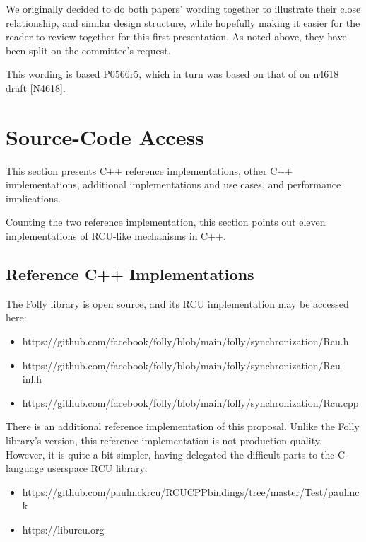 We originally decided to do both papers' wording together to illustrate
their close relationship, and similar design structure, while hopefully
making it easier for the reader to review together for this first
presentation.
As noted above, they have been split on the committee's request.

This wording is based P0566r5, which in turn was based on that of on
n4618 draft [N4618].

\section{Source-Code Access}
\label{sec:Source-Code Access}

This section presents C++ reference implementations, other
C++ implementations, additional implementations and use cases,
and performance implications.

Counting the two reference implementation, this section points out
eleven implementations of RCU-like mechanisms in C++.

\subsection{Reference C++ Implementations}
\label{sec:Reference C++ Implementations}

The Folly library is open source, and its RCU implementation may be
accessed here:

\begin{itemize}
\item	https://github.com/facebook/folly/blob/main/folly/synchronization/Rcu.h
\item	https://github.com/facebook/folly/blob/main/folly/synchronization/Rcu-inl.h
\item	https://github.com/facebook/folly/blob/main/folly/synchronization/Rcu.cpp
\end{itemize}

There is an additional reference implementation of this proposal.
Unlike the Folly library's version, this reference implementation is
not production quality.
However, it is quite a bit simpler, having delegated the difficult parts
to the C-language userspace RCU library:

\begin{itemize}
\item	https://github.com/paulmckrcu/RCUCPPbindings/tree/master/Test/paulmck
\item	https://liburcu.org
\end{itemize}

